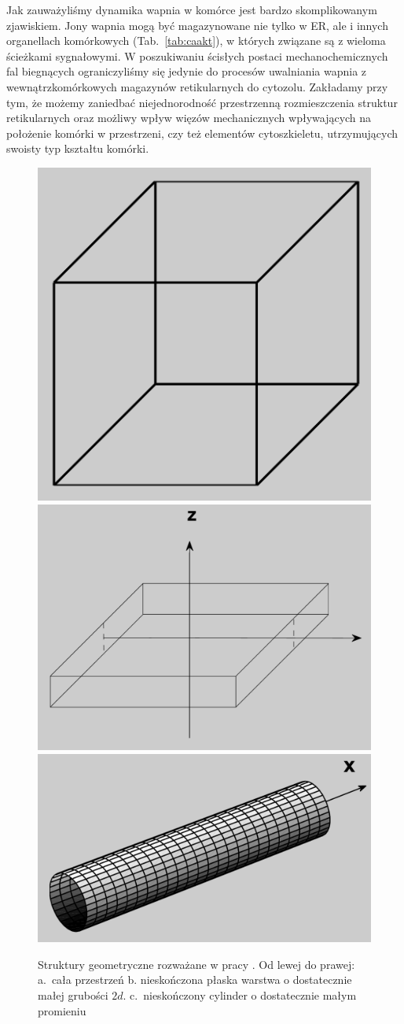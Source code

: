 \medskip

Jak zauważyliśmy dynamika wapnia w komórce jest bardzo skomplikowanym zjawiskiem. Jony wapnia mogą być magazynowane nie tylko w ER, ale i innych organellach komórkowych (Tab.~\ref{tab:caakt}), w których związane są z wieloma ścieżkami sygnałowymi. W poszukiwaniu ścisłych postaci mechanochemicznych fal biegnących ograniczyliśmy się jedynie do procesów uwalniania wapnia z wewnątrzkomórkowych magazynów retikularnych do cytozolu. Zakładamy przy tym, że możemy zaniedbać niejednorodność przestrzenną rozmieszczenia struktur retikularnych oraz możliwy wpływ więzów mechanicznych wpływających na położenie komórki w przestrzeni, czy też elementów cytoszkieletu, utrzymujących swoisty typ kształtu komórki. 



\begin{figure} 
	\includegraphics[width=0.243\linewidth]{rysunki/rozdzial_3/parap.png} 
	\includegraphics[width=0.33\linewidth]{rysunki/rozdzial_3/plate12.png} 
	\includegraphics[width=0.43\linewidth]{rysunki/rozdzial_3/walec2.png} \\
	\caption[Struktury geometryczne rozważane w pracy]{Struktury geometryczne rozważane w pracy \cite{Kazmierczak2010}. Od lewej do prawej: a.~cała przestrzeń b. nieskończona płaska warstwa o dostatecznie małej grubości $2d$. c.~nieskończony cylinder o dostatecznie małym promieniu}\label{f1}
\end{figure}


